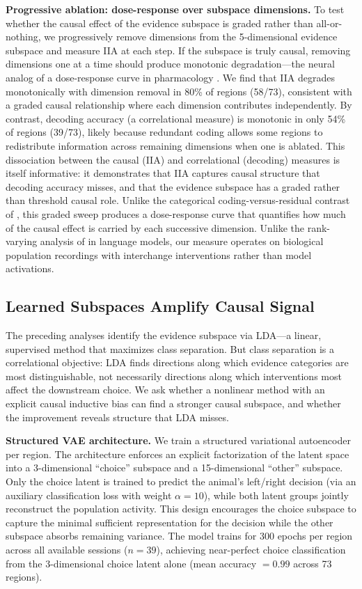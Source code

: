 \documentclass{article}
\begin{document}
\textbf{Progressive ablation: dose-response over subspace dimensions.} To test whether the causal effect of the evidence subspace is graded rather than all-or-nothing, we progressively remove dimensions from the 5-dimensional evidence subspace and measure IIA at each step. If the subspace is truly causal, removing dimensions one at a time should produce monotonic degradation---the neural analog of a dose-response curve in pharmacology \citep{pereira2025residual}. We find that IIA degrades monotonically with dimension removal in 80\% of regions (58/73), consistent with a graded causal relationship where each dimension contributes independently. By contrast, decoding accuracy (a correlational measure) is monotonic in only 54\% of regions (39/73), likely because redundant coding allows some regions to redistribute information across remaining dimensions when one is ablated. This dissociation between the causal (IIA) and correlational (decoding) measures is itself informative: it demonstrates that IIA captures causal structure that decoding accuracy misses, and that the evidence subspace has a graded rather than threshold causal role. Unlike the categorical coding-versus-residual contrast of \citet{pereira2025residual}, this graded sweep produces a dose-response curve that quantifies how much of the causal effect is carried by each successive dimension. Unlike the rank-varying analysis of \citet{lowrank2026llm} in language models, our measure operates on biological population recordings with interchange interventions rather than model activations.

\subsection{Learned Subspaces Amplify Causal Signal}

The preceding analyses identify the evidence subspace via LDA---a linear, supervised method that maximizes class separation. But class separation is a correlational objective: LDA finds directions along which evidence categories are most distinguishable, not necessarily directions along which interventions most affect the downstream choice. We ask whether a nonlinear method with an explicit causal inductive bias can find a stronger causal subspace, and whether the improvement reveals structure that LDA misses.

\textbf{Structured VAE architecture.} We train a structured variational autoencoder \citep{narayanaswamy2017learning} per region. The architecture enforces an explicit factorization of the latent space into a 3-dimensional ``choice'' subspace and a 15-dimensional ``other'' subspace. Only the choice latent is trained to predict the animal's left/right decision (via an auxiliary classification loss with weight $\alpha = 10$), while both latent groups jointly reconstruct the population activity. This design encourages the choice subspace to capture the minimal sufficient representation for the decision while the other subspace absorbs remaining variance. The model trains for 300 epochs per region across all available sessions ($n = 39$), achieving near-perfect choice classification from the 3-dimensional choice latent alone (mean accuracy $= 0.99$ across 73 regions).
\end{document}
